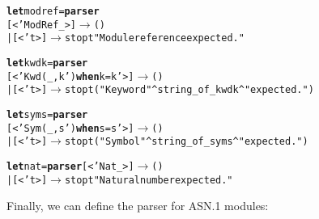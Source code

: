 \begin{alltt}
\textbf{let} modref = \textbf{parser}
  [< 'ModRef \_ >] \(\rightarrow\) ()
| [< 't >] \(\rightarrow\) stop t "Module reference expected."

\textbf{let} kwd k = \textbf{parser}
  [< 'Kwd (\_,k') \textbf{when} k=k' >] \(\rightarrow\) ()
| [< 't >] \(\rightarrow\) stop t ("Keyword "^ string\_of\_kwd k ^ " expected.")

\textbf{let} sym s = \textbf{parser}
  [< 'Sym (\_,s') \textbf{when} s=s' >] \(\rightarrow\) ()
| [< 't >] \(\rightarrow\) stop t ("Symbol " ^ string\_of\_sym s ^ " expected.")

\textbf{let} nat = \textbf{parser} [< 'Nat \_ >] \(\rightarrow\) ()
               | [< 't >] \(\rightarrow\) stop t "Natural number expected."
\end{alltt}
Finally, we can define the parser for ASN.1 modules:
